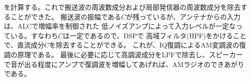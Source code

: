 を計算する。これで搬送波の周波数成分および局部発信器の周波数成分を除去することができた。
搬送波の振幅である$C$が残っているが、アンテナからの入力は、ALCで増幅率を制御された
低ノイズアンプによって入力レベルが一定なっている。すなわち$C$は一定であるので、DSPで
高域フィルタ(HPF)をかけることで、直流成分$C$を除去することができる。
これが、IQ復調によるAM変調波の復調の原理である。
最後に必要に応じて高調波成分をLPFで除去し、スピーカーで音が出る程度にアンプで復調波を増幅してあげれば、AMラジオのできあがりである。
\begin{figure}
\begin{minipage}{0.5\hsize}
\end{minipage}

\end{figure}
